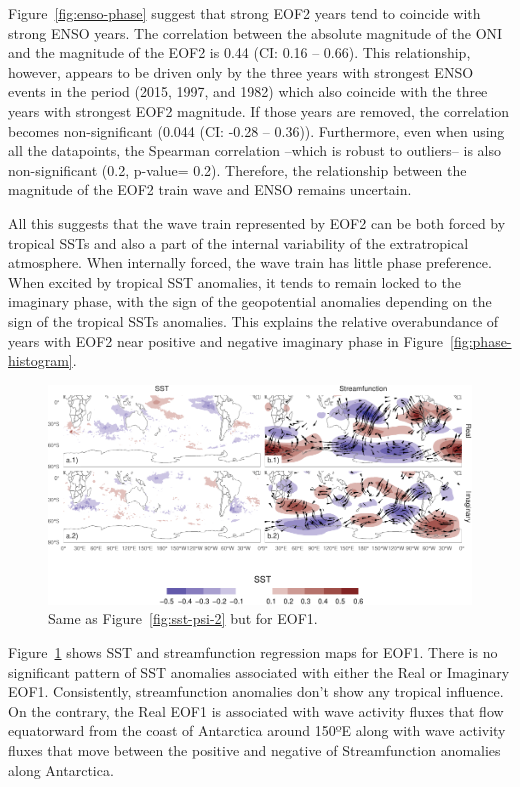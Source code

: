 \documentclass[smallextended]{svjour3}       %
\begin{document}
Figure~\ref{fig:enso-phase} suggest that strong EOF2 years tend to coincide with strong ENSO years. The correlation between the absolute magnitude of the ONI and the magnitude of the EOF2 is 0.44 (CI: 0.16 -- 0.66). This relationship, however, appears to be driven only by the three years with strongest ENSO events in the period (2015, 1997, and 1982) which also coincide with the three years with strongest EOF2 magnitude. If those years are removed, the correlation becomes non-significant (0.044 (CI: -0.28 -- 0.36)). Furthermore, even when using all the datapoints, the Spearman correlation --which is robust to outliers-- is also non-significant (0.2, p-value= 0.2). Therefore, the relationship between the magnitude of the EOF2 train wave and ENSO remains uncertain.

All this suggests that the wave train represented by EOF2 can be both forced by tropical SSTs and also a part of the internal variability of the extratropical atmosphere. When internally forced, the wave train has little phase preference. When excited by tropical SST anomalies, it tends to remain locked to the imaginary phase, with the sign of the geopotential anomalies depending on the sign of the tropical SSTs anomalies. This explains the relative overabundance of years with EOF2 near positive and negative imaginary phase in Figure~\ref{fig:phase-histogram}.



\begin{figure}
\includegraphics{../figures/sst-psi-1-1} \caption{Same as Figure~\ref{fig:sst-psi-2} but for EOF1.}\label{fig:sst-psi-1}
\end{figure}

Figure~\ref{fig:sst-psi-1} shows SST and streamfunction regression maps for EOF1. There is no significant pattern of SST anomalies associated with either the Real or Imaginary EOF1. Consistently, streamfunction anomalies don't show any tropical influence. On the contrary, the Real EOF1 is associated with wave activity fluxes that flow equatorward from the coast of Antarctica around 150ºE along with wave activity fluxes that move between the positive and negative of Streamfunction anomalies along Antarctica.
\end{document}
